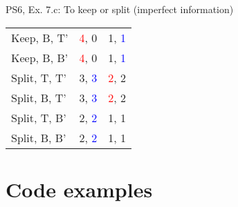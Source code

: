 \begin{frame}{PS6, Ex. 7.c: To keep or split (imperfect information)}
\begin{multicols}{2}
\begin{table}
\begin{tabular}{l|c|c|}
        Keep, B, T' & \textcolor{red}{4}, 0 & 1, \textcolor{blue}{1} \\\cline{2-3}
        Keep, B, B' & \textcolor{red}{4}, 0 & 1, \textcolor{blue}{1} \\\cline{2-3}
        Split, T, T' & 3, \textcolor{blue}{3} & \textcolor{red}{2}, 2 \\\cline{2-3}
        Split, B, T' & 3, \textcolor{blue}{3} & \textcolor{red}{2}, 2 \\\cline{2-3}
        Split, T, B' & 2, \textcolor{blue}{2} & 1, 1 \\\cline{2-3}
        Split, B, B' & 2, \textcolor{blue}{2} & 1, 1 \\\cline{2-3}
      \end{tabular}
    \end{table}
    \vfill\null
  \end{multicols}
\end{frame}




\section{Code examples} %

